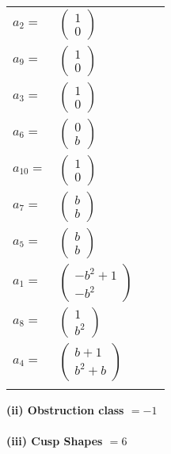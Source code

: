 \documentclass[1p]{elsarticle_modified}
\theoremstyle{definition}
\begin{document}
\begin{tabular}{m{7pt} m{180pt} m{7pt} m{180pt} }
\flushright $a_{2}=$&$\begin{pmatrix}1\\0\end{pmatrix}$ \\
\flushright $a_{9}=$&$\begin{pmatrix}1\\0\end{pmatrix}$ \\
\flushright $a_{3}=$&$\begin{pmatrix}1\\0\end{pmatrix}$ \\
\flushright $a_{6}=$&$\begin{pmatrix}0\\b\end{pmatrix}$ \\
\flushright $a_{10}=$&$\begin{pmatrix}1\\0\end{pmatrix}$ \\
\flushright $a_{7}=$&$\begin{pmatrix}b\\b\end{pmatrix}$ \\
\flushright $a_{5}=$&$\begin{pmatrix}b\\b\end{pmatrix}$ \\
\flushright $a_{1}=$&$\begin{pmatrix}- b^2+1\\- b^2\end{pmatrix}$ \\
\flushright $a_{8}=$&$\begin{pmatrix}1\\b^2\end{pmatrix}$ \\
\flushright $a_{4}=$&$\begin{pmatrix}b+1\\b^2+b\end{pmatrix}$\\&\end{tabular}
\flushleft \textbf{(ii) Obstruction class $= -1$}\\~\\
\flushleft \textbf{(iii) Cusp Shapes $= 6$}\\~\\
\end{document}
